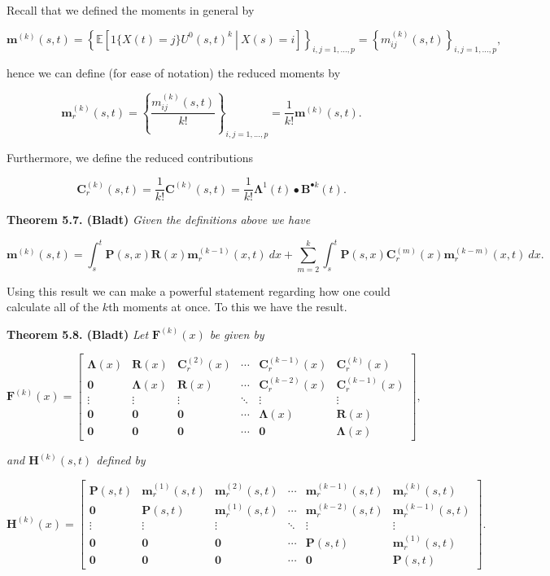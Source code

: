 \documentclass[a4paper,10pt,openany]{book}
\begin{document}
Recall that we defined the moments in general by

\[
\mathbf m^{(k)}(s,t)=\left\{\mathbb E\left[\left. 1\{X(t)=j\}U^0(s,t)^k\ \right\vert\ X(s)=i\right]\right\}_{i,j=1,...,p}=\left\{m^{(k)}_{ij}(s,t)\right\}_{i,j=1,...,p},
\]

hence we can define (for ease of notation) the reduced moments by

\[
\mathbf m_r^{(k)}(s,t)=\left\{\frac{m^{(k)}_{ij}(s,t)}{k!}\right\}_{i,j=1,...,p}=\frac{1}{k!}\mathbf m^{(k)}(s,t).
\]

Furthermore, we define the reduced contributions

\[
\mathbf C^{(k)}_r(s,t)=\frac{1}{k!}\mathbf C^{(k)}(s,t)=\frac{1}{k!}\mathbf \Lambda^1(t)\bullet \mathbf B^{\bullet k}(t).
\]

\textbf{Theorem 5.7. (Bladt)} \emph{Given the definitions above we have}

\[
\mathbf m^{(k)}(s,t)=\int_s^t\mathbf P(s,x)\mathbf R(x)\mathbf m^{(k-1)}_r(x,t)\ dx+\sum_{m=2}^k\int_s^t\mathbf P(s,x)\mathbf C^{(m)}_r(x)\mathbf m^{(k-m)}_r(x,t)\ dx.
\]

Using this result we can make a powerful statement regarding how one could calculate all of the \(k\)th moments at once. To this we have the result.

\textbf{Theorem 5.8. (Bladt)} \emph{Let \(\mathbf F^{(k)}(x)\) be given by}

\[
\mathbf F^{(k)}(x)=
\begin{bmatrix}
\mathbf \Lambda(x) & \mathbf R(x) & \mathbf C^{(2)}_r(x) & \cdots & \mathbf C^{(k-1)}_r(x) & \mathbf C^{(k)}_r(x)\\
\mathbf 0 & \mathbf \Lambda(x) & \mathbf R(x) & \cdots & \mathbf C^{(k-2)}_r(x) & \mathbf C^{(k-1)}_r(x)\\
\vdots & \vdots & \vdots & \ddots & \vdots & \vdots \\
\mathbf 0 & \mathbf 0 & \mathbf 0 & \cdots &\mathbf \Lambda(x) & \mathbf R(x)\\
\mathbf 0 & \mathbf 0 & \mathbf 0 & \cdots & \mathbf 0 &\mathbf \Lambda(x)
\end{bmatrix},
\]

\emph{and \(\mathbf H^{(k)}(s,t)\) defined by}

\[
\mathbf H^{(k)}(x)=
\begin{bmatrix}
\mathbf P(s,t) & \mathbf m_r^{(1)}(s,t) & \mathbf m_r^{(2)}(s,t) & \cdots & \mathbf m_r^{(k-1)}(s,t) & \mathbf m_r^{(k)}(s,t)\\
\mathbf 0 & \mathbf P(s,t) & \mathbf m_r^{(1)}(s,t) & \cdots & \mathbf m_r^{(k-2)}(s,t) & \mathbf m_r^{(k-1)}(s,t)\\
\vdots & \vdots & \vdots & \ddots & \vdots & \vdots \\
\mathbf 0 & \mathbf 0 & \mathbf 0 & \cdots & \mathbf P(s,t) & \mathbf m_r^{(1)}(s,t)\\
\mathbf 0 & \mathbf 0 & \mathbf 0 & \cdots & \mathbf 0 & \mathbf P(s,t)
\end{bmatrix}.
\]
\end{document}
